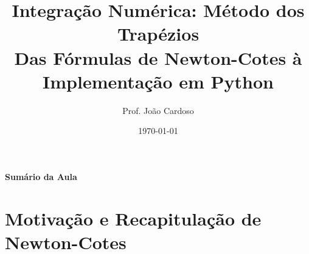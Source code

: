 \documentclass[aspectratio=169]{beamer}
\title{Integração Numérica: Método dos Trapézios\\Das Fórmulas de Newton-Cotes à Implementação em Python}
\author{Prof. João Cardoso}
\date{\today}
\begin{document}


\begin{frame}[plain]
    \begingroup
        \selectfont
        \Huge\color{red!70!black}\textbf{Sumário da Aula}\\[0.6em]
    \endgroup
    \begingroup
        \tableofcontents
    \endgroup
\end{frame}

\section{Motivação e Recapitulação de Newton-Cotes}
\end{document}
